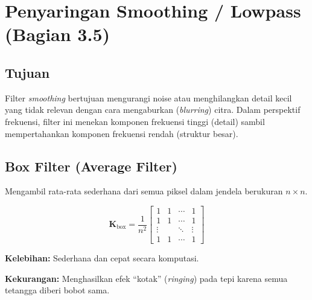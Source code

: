 \documentclass[12pt,a4paper]{article}
\begin{document}
\section{Penyaringan Smoothing / Lowpass (Bagian 3.5)}

\subsection{Tujuan}

Filter \textit{smoothing} bertujuan mengurangi noise atau menghilangkan detail kecil yang tidak relevan dengan cara mengaburkan (\textit{blurring}) citra. Dalam perspektif frekuensi, filter ini menekan komponen frekuensi tinggi (detail) sambil mempertahankan komponen frekuensi rendah (struktur besar).

\subsection{Box Filter (Average Filter)}

Mengambil rata-rata sederhana dari semua piksel dalam jendela berukuran $n \times n$.

\begin{equation}
  \mathbf{K}_{\text{box}} = \frac{1}{n^2}
  \begin{bmatrix}
    1 & 1 & \cdots & 1 \\
    1 & 1 & \cdots & 1 \\
    \vdots & & \ddots & \vdots \\
    1 & 1 & \cdots & 1
  \end{bmatrix}
  \label{eq:box_filter}
\end{equation}

\textbf{Kelebihan:} Sederhana dan cepat secara komputasi.

\textbf{Kekurangan:} Menghasilkan efek ``kotak'' (\textit{ringing}) pada tepi karena semua tetangga diberi bobot sama.

\setcounter{figure}{30}
\end{document}

